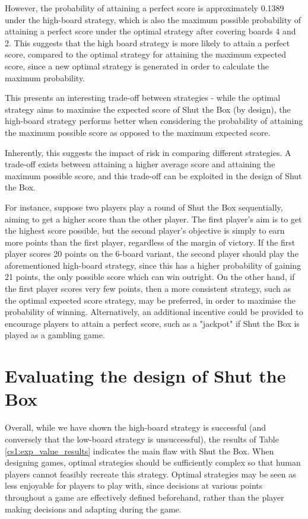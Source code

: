 \begin{example}
However, the probability of attaining a perfect score is approximately 0.1389 under the high-board strategy, which is also the maximum possible probability of attaining a perfect score under the optimal strategy after covering boards 4 and 2. This suggests that the high board strategy is more likely to attain a perfect score, compared to the optimal strategy for attaining the maximum expected score, since a new optimal strategy is generated in order to calculate the maximum probability.
\end{example}

This presents an interesting trade-off between strategies - while the optimal strategy aims to maximise the expected score of Shut the Box (by design), the high-board strategy performs better when considering the probability of attaining the maximum possible score as opposed to the maximum expected score.

Inherently, this suggests the impact of risk in comparing different strategies. A trade-off exists between attaining a higher average score and attaining the maximum possible score, and this trade-off can be exploited in the design of Shut the Box.

For instance, suppose two players play a round of Shut the Box sequentially, aiming to get a higher score than the other player. The first player's aim is to get the highest score possible, but the second player's objective is simply to earn more points than the first player, regardless of the margin of victory. If the first player scores 20 points on the 6-board variant, the second player should play the aforementioned high-board strategy, since this has a higher probability of gaining 21 points, the only possible score which can win outright. On the other hand, if the first player scores very few points, then a more consistent strategy, such as the optimal expected score strategy, may be preferred, in order to maximise the probability of winning. Alternatively, an additional incentive could be provided to encourage players to attain a perfect score, such as a "jackpot" if Shut the Box is played as a gambling game.

\section{Evaluating the design of Shut the Box}


Overall, while we have shown the high-board strategy is successful (and conversely that the low-board strategy is unsuccessful), the results of Table \ref{cs1:exp_value_results} indicates the main flaw with Shut the Box. When designing games, optimal strategies should be sufficiently complex so that human players cannot feasibly recreate this strategy. Optimal strategies may be seen as less enjoyable for players to play with, since decisions at various points throughout a game are effectively defined beforehand, rather than the player making decisions and adapting during the game. 

